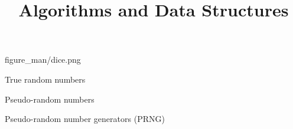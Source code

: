 \documentclass[11pt,compress,t,notes=noshow, xcolor=table]{beamer}
\title{Algorithms and Data Structures}
\begin{document}
{figure_man/dice.png}
{
  \item True random numbers
  \item Pseudo-random numbers
  \item Pseudo-random number generators (PRNG)
}

% 
% 
% 
\end{document}
